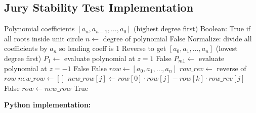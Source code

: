\subsection{Jury Stability Test Implementation}

\begin{algorithm}[htbp]
\caption{Jury Stability Test}
\label{alg:jury_test}
\begin{algorithmic}[1]
\REQUIRE Polynomial coefficients $[a_n, a_{n-1}, \ldots, a_0]$ (highest degree first)
\ENSURE Boolean: True if all roots inside unit circle
\STATE $n \gets$ degree of polynomial
\STATE {}
    \RETURN False 
\ENDIF
\STATE Normalize: divide all coefficients by $a_n$ so leading coeff is 1
\STATE Reverse to get $[a_0, a_1, \ldots, a_n]$ (lowest degree first)
\STATE $P_1 \gets$ evaluate polynomial at $z = 1$
    \RETURN False
\ENDIF
\STATE $P_{m1} \gets$ evaluate polynomial at $z = -1$
    \RETURN False
\ENDIF
{}
    \RETURN False
\ENDIF
\STATE {}
\STATE $row \gets [a_0, a_1, \ldots, a_n]$
    \STATE $row\_rev \gets$ reverse of $row$
    \STATE $new\_row \gets []$
        \STATE $new\_row[j] \gets row[0] \cdot row[j] - row[k] \cdot row\_rev[j]$
    \ENDFOR
        \RETURN False
    \ENDIF
    \STATE $row \gets new\_row$
\ENDFOR
\RETURN True
\end{algorithmic}
\end{algorithm}

\textbf{Python implementation:}

